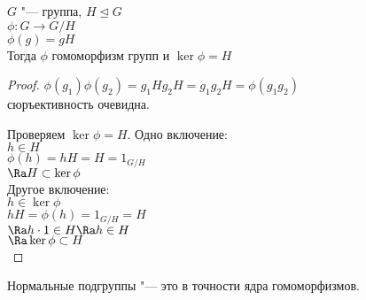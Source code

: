 \begin{theorem}
$G$ "--- группа, $H \unlhd G$\\
$\phi \colon G \to G / H$\\
$\phi(g) = gH$ \\

Тогда $\phi$ гомоморфизм групп и  $\ker \phi = H$\\
\end{theorem}
\begin{proof}
$\phi(g_1)\phi(g_2) = g_1Hg_2H = g_1g_2H = \phi(g_1g_2)$\\
сюръективность очевидна. 

Проверяем $\ker \phi = H$.
Одно включение:\\
$h \in H$\\
$\phi(h) = hH =  H = 1_{G/H}$\\
$\Ra H \subset \ker \phi$\\

Другое включение:\\
$h \in \ker \phi$\\
$hH = \phi(h) = 1_{G/H} = H$ \\
$\Ra h\cdot1 \in H \Ra h \in H$\\
$\Ra \ker \phi \subset H$\\

\end{proof}

\begin{conseq}
Нормальные подгруппы "--- это в точности ядра гомоморфизмов.
\end{conseq}
